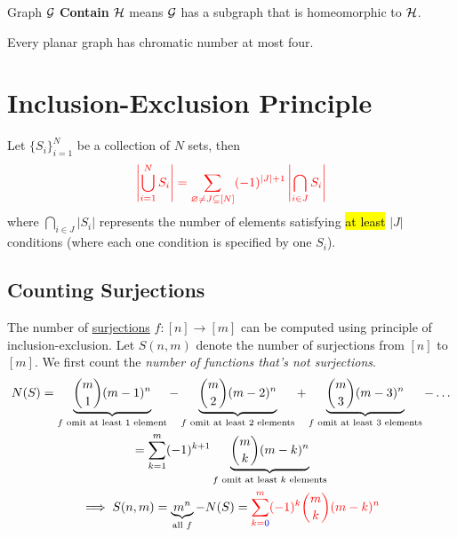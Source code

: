 \documentclass{article}
\begin{document}
			\begin{definition}
				Graph $\mathcal{{G}}$ \textbf{Contain} $\mathcal{{H}}$ means $\mathcal{{G}}$ has a subgraph that is homeomorphic to $\mathcal{{H}}$.
			\end{definition}
			
			\begin{theorem}
				Every planar graph has chromatic number at most four.
			\end{theorem}
		
		\section{Inclusion-Exclusion Principle}
			\begin{theorem}
				Let $\{S_i\}_{i=1}^N$ be a collection of $N$ sets, then
				\begin{equation}
				\textcolor{red}{
					\left\vert \bigcup_{i=1}^N S_i \right\vert = \sum_{\varnothing \neq J \subseteq [N]} (-1)^{|J|+1} \left\vert \bigcap_{i \in J} S_i \right\vert
				}
				\end{equation}
				where $\bigcap_{i \in J} \left\vert S_i \right\vert$ represents the number of elements satisfying \hl{at least} $|J|$ conditions (where each one condition is specified by one $S_i$).
			\end{theorem}
		
			\subsection{Counting Surjections}
				\begin{theorem}
					The number of \ul{surjections} $f: [n] \to [m]$ can be computed using principle of inclusion-exclusion. Let $S(n, m)$ denote the number of surjections from $[n]$ to $[m]$. We first count the \emph{number of functions that's not surjections}.
					\begin{gather}
						N(S) = \underbrace{\binom{m}{1} (m-1)^n}_{f \text{{ omit at least 1 element}}} 
						- \underbrace{\binom{m}{2} (m-2)^n}_{f \text{{ omit at least 2 elements}}}
						+ \underbrace{\binom{m}{3} (m-3)^n}_{f \text{{ omit at least 3 elements}}} - \dots \\
						= \sum_{k=1}^m (-1)^{k+1} \underbrace{\binom{m}{k} (m-k)^n}_{f \text{{ omit at least $k$ elements}}} \\
					\implies S(n, m) = \underbrace{m^n}_{\text{{all }} f} - N(S) = \textcolor{red}{\sum_{k=\textcolor{blue}{0}}^m (-1)^{k} \binom{m}{k} (m-k)^n}
					\end{gather}
				\end{theorem}
				
\end{document}
